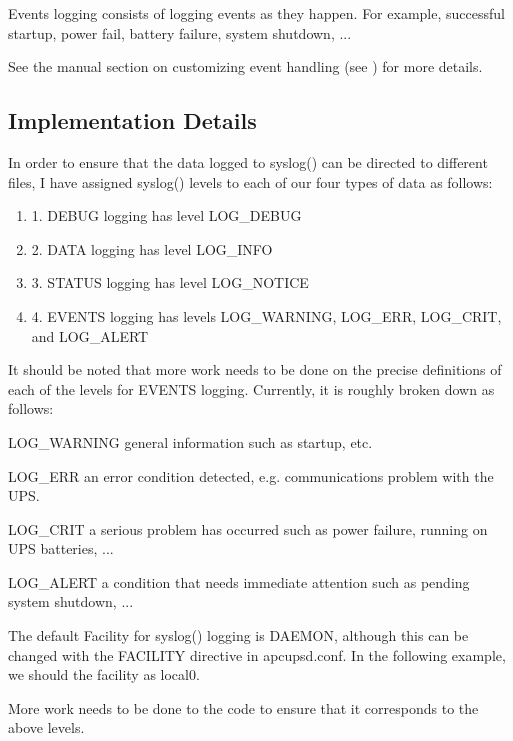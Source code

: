 {{{{{{{Events logging consists of logging events as they happen. For example,
successful startup, power fail, battery failure, system shutdown, ...  

See the manual section on customizing event handling (see 
) for
more details. 

\label{Implementation-Details}

\subsection*{Implementation Details}

In order to ensure that the data logged to syslog() can be directed to
different files, I have assigned syslog() levels to each of our four types of
data as follows:  

\begin{enumerate}
\item 1. DEBUG logging has level LOG\_DEBUG  
\item 2. DATA logging has level LOG\_INFO  
\item 3. STATUS logging has level LOG\_NOTICE  
\item 4. EVENTS logging has levels LOG\_WARNING, LOG\_ERR, LOG\_CRIT, and
   LOG\_ALERT  
   \end{enumerate}

It should be noted that more work needs to be done on the precise definitions
of each of the levels for EVENTS logging. Currently, it is roughly broken down
as follows:  

LOG\_WARNING general information such as startup, etc.  

LOG\_ERR an error condition detected, e.g. communications problem with the
UPS.  

LOG\_CRIT a serious problem has occurred such as power failure, running on UPS
batteries, ...  

LOG\_ALERT a condition that needs immediate attention such as pending system
shutdown, ...  

The default Facility for syslog() logging is DAEMON, although this can be
changed with the FACILITY directive in apcupsd.conf. In the following example,
we should the facility as local0.  

More work needs to be done to the code to ensure that it corresponds to the
above levels.  

}}}}}}}
